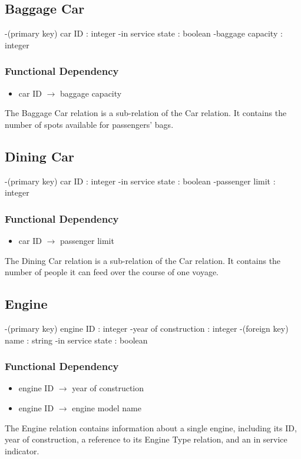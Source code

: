 \documentclass[a4paper]{article}
\begin{document}
\subsection*{Baggage Car}
\begin{itemize}
-(primary key) car ID : integer
-in service state : boolean
-baggage capacity  : integer
\end{itemize}
\subsubsection*{Functional Dependency}
\begin{itemize}
\item car ID $\rightarrow$ baggage capacity
\end{itemize}
The Baggage Car relation is a sub-relation of the Car relation. It contains the number of spots available for passengers' bags.

\subsection*{Dining Car}
\begin{itemize}
-(primary key) car ID : integer
-in service state : boolean
-passenger limit : integer
\end{itemize}
\subsubsection*{Functional Dependency}
\begin{itemize}
\item car ID $\rightarrow$ passenger limit
\end{itemize}
The Dining Car relation is a sub-relation of the Car relation. It contains the number of people it can feed over the course of one voyage.

\subsection*{Engine}
\begin{itemize}
-(primary key) engine ID : integer
-year of construction : integer
-(foreign key) name : string
-in service state : boolean
\end{itemize}
\subsubsection*{Functional Dependency}
\begin{itemize}
\item engine ID $\rightarrow$ year of construction
\item engine ID $\rightarrow$ engine model name
\end{itemize}
The Engine relation contains information about a single engine, including its ID, year of construction, a reference to its Engine Type relation, and an in service indicator.
\end{document}
